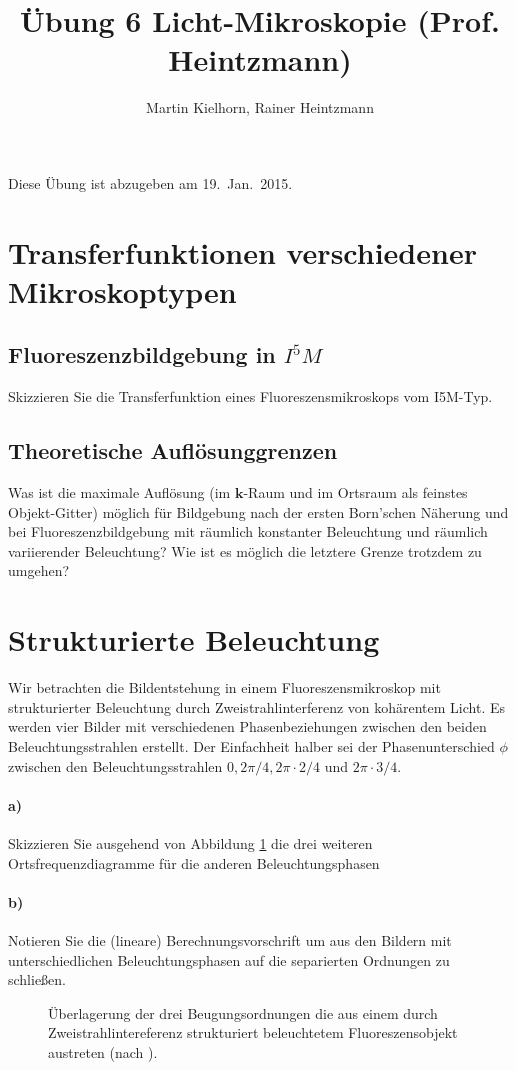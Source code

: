 \documentclass{article}
\begin{document}
\author{Martin Kielhorn, Rainer Heintzmann}
\title{\"Ubung 6 Licht-Mikroskopie (Prof. Heintzmann)}
\maketitle
\noindent Diese \"Ubung ist abzugeben am 19.~Jan.~2015.

\section{Transferfunktionen verschiedener Mikroskoptypen}
\subsection*{Fluoreszenzbildgebung in $I^5M$}
Skizzieren Sie die Transferfunktion eines Fluoreszensmikroskops vom I5M-Typ.

\subsection*{Theoretische Aufl\"osunggrenzen}

Was ist die maximale Aufl\"osung (im $\mathbf{k}$-Raum und im Ortsraum als feinstes Objekt-Gitter) m\"oglich f\"ur Bildgebung nach der ersten Born'schen Näherung und bei Fluoreszenzbildgebung mit räumlich konstanter Beleuchtung und räumlich variierender Beleuchtung? Wie ist es möglich die letztere Grenze trotzdem zu umgehen?


\section{Strukturierte Beleuchtung}

Wir betrachten die Bildentstehung in einem Fluoreszensmikroskop mit
strukturierter Beleuchtung durch Zweistrahlinterferenz von
koh\"arentem Licht. Es werden vier Bilder mit verschiedenen
Phasenbeziehungen zwischen den beiden Beleuchtungsstrahlen
erstellt. Der Einfachheit halber sei der Phasenunterschied $\phi$
zwischen den Beleuchtungsstrahlen $0, 2\pi/4, 2\pi\cdot 2/4$ und
$2\pi\cdot 3/4$.

\paragraph{a)} 
Skizzieren Sie ausgehend von Abbildung \ref{fig:sim-mixing} die
drei weiteren Ortsfrequenzdiagramme f\"ur die anderen Beleuchtungsphasen 

\paragraph{b)}
Notieren Sie die (lineare) Berechnungsvorschrift um aus den Bildern
mit unterschiedlichen Beleuchtungsphasen auf die separierten Ordnungen
zu schlie\ss en.

\begin{figure}[htbp]
  \centering
  
  \caption{\"Uberlagerung der drei Beugungsordnungen die aus einem
    durch Zweistrahlintereferenz strukturiert beleuchtetem
    Fluoreszensobjekt austreten (nach
    \cite{heintzmann1999laterally}).}
  \label{fig:sim-mixing}
\end{figure}



\end{document}
